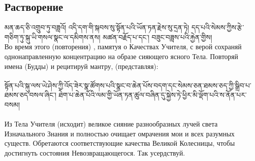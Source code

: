 \subsection{Растворение}
\scriptsize
\ti
མན་ཆད་ཅི་འགྲུབ་ཏུ་བཟླའོ། འདི་དག་གི་སྐབས་སུ་སྟོན་པའི་ཡོན་ཏན་རྗེས་སུ་དྲན་ཏེ། དད་པའི་སེམས་ཀྱིས་རྩེ་གཅིག་ཏུ་སྐུ་ཡི་གསལ་སྣང་ལ་དམིགས་ནས། མཚན་བརྗོད་པ་དང་། བཟུང་བཟླས་པའི་རྐྱེན་གྱིས།\\
\ru
Во время этого (повторения) , памятуя о Качествах Учителя, с верой сохраняй
однонаправленную концентрацию на образе сияющего ясного Тела.
Повторяй имена (Будды) и рецитируй мантру, (представляя):\\
\\
\normalsize
\ti
སྟོན་པའི་སྐུ་ལས་ཡེ་ཤེས་ཀྱི་འོད་ཟེར་སྣ་ཚོགས་པའི་སྣང་བ་ཆེན་པོས་བདག་དང་སེམས་ཅན་ཐམས་ཅད་ཀྱི་སྒྲིབ་པ་ཐམས་ཅད་བསལ་ཞིང་།
ཐེག་པ་ཆེན་པོའི་ལམ་གྱི་ཡོན་ཏན་ཚུལ་བཞིན་དུ་སྐྱེས་ཏེ་ཕྱིར་མི་ལྡོག་པའི་ས་ནོན་པར་བསམ།\\
\\
\ru
Из Тела Учителя (исходит) великое сияние разнообразных лучей света Изначального
Знания и полностью очищает омрачения мои и всех разумных существ. Обретаются
соответствующие качества Великой Колесницы, чтобы достигнуть состояния Невозвращающегося.
Так усердствуй.\\
\\
\scriptsize
\ti
